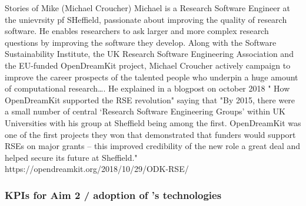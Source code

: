 \begin{Aim 1}
             Stories of Mike (Michael Croucher)
Michael is a Research Software Engineer at the unievrsity pf SHeffield, passionate about improving the quality of research
software. He enables researchers to ask larger and more complex research questions by improving the software they develop. Along with the Software Sustainability Institute, the UK Research Software Engineering Association and the EU-funded OpenDreamKit project, Michael Croucher actively campaign to improve the career prospects of the talented people who underpin a huge amount of computational research…. He explained in a blogpost on october 2018 " How OpenDreamKit supported the RSE revolution" saying that "By 2015, there were a small number of central ‘Research Software Engineering Groups’ within UK Universities with his group at Sheffield  being among the first. OpenDreamKit was one of the first projects they won that demonstrated that funders would support RSEs on major grants – this improved credibility of the new role a great deal and helped secure its future at Sheffield."%
 https://opendreamkit.org/2018/10/29/ODK-RSE/
                              

\subsubsection{KPIs for Aim 2 / adoption of \ODK's technologies}

\end{Aim 1}
